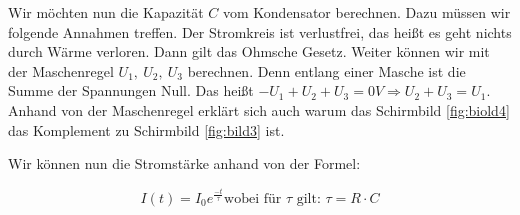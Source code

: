        Wir möchten nun die Kapazität $C$ vom Kondensator berechnen. Dazu müssen wir folgende Annahmen treffen. Der Stromkreis ist verlustfrei, das heißt es geht nichts durch Wärme verloren. Dann gilt das Ohmsche Gesetz. Weiter können wir mit der Maschenregel $U_1,\ U_2,\ U_3$ berechnen. Denn entlang einer Masche ist die Summe der Spannungen Null. Das heißt $-U_1 + U_2 + U_3 = 0V  \Rightarrow U_2 + U_3 = U_1$. Anhand von der Maschenregel erklärt sich auch warum das Schirmbild \ref{fig:biold4} das Komplement zu Schirmbild \ref{fig:bild3} ist.
       
       Wir können nun die Stromstärke anhand von der Formel:

       \begin{equation}
       	I(t)=I_0e^{\frac{-t}{\tau}} \text{wobei für $\tau$ gilt: } \tau = R \cdot C
       	\label{eq:kapazität}
       \end{equation}
